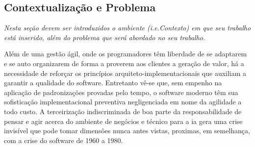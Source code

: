 

\subsection{\textbf{Contextualização e Problema}}
    \label{subsec:contextualizacao-problema}

    \textit{Nesta seção devem ser introduzidos o ambiente (\textit{i.e.}Contexto) em que seu trabalho
    está inserido, além do problema que será abordado no seu trabalho.}

    Além de uma gestão ágil, onde os programadores têm liberdade de se adaptarem e
    se auto organizarem de forma a proverem aos clientes a geração de valor, há
    a necessidade de reforçar os princípios arquiteto-implementacionais que auxiliam
    a garantir a qualidade do software.
      Entretanto vê-se que, sem empenho na aplicação de padronizações provadas pelo
    tempo, o software moderno têm sua sofisticação implementacional preventiva negligenciada em
    nome da agilidade a todo custo.
      A terceirização indiscriminada de boa parte da responsabilidade de pensar e agir
    acerca do ambiente de negócios e técnico para a \ac{ia} gera uma crise invisível que
    pode tomar dimensôes nunca antes vistas, proximas, em semelhança, com a crise do software
    de 1960 a 1980.

